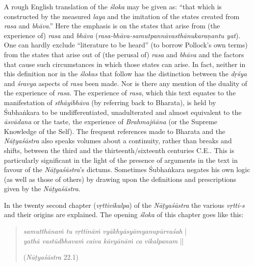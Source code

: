 A rough English translation of the \textsl{śloka} may be given as: “that which is constructed by the measured \textsl{laya} and the imitation of the states created from \textsl{rasa} and \textsl{bhāva}.” Here the emphasis is on the states that arise from (the experience of) \textsl{rasa} and \textsl{bhāva} (\textsl{rasa-bhāva-samutpannāvasthānukaraṇantu yat}). One can hardly exclude “literature to be heard” (to borrow Pollock’s own terms) from the states that arise out of (the perusal of) \textsl{rasa} and \textsl{bhāva} and the factors that cause such circumstances in which those states can arise. In fact, neither in this definition nor in the \textsl{ślokas} that follow has the distinction between the \textsl{dṛśya} and \textsl{śravya} aspects of \textsl{rasa} been made. Nor is there any mention of the duality of the experience of \textsl{rasa}. The experience of \textsl{rasa}, which this text equates to the manifestation of \textsl{sthāyībhāva} (by referring back to Bharata), is held by Śubhaṅkara to be undifferentiated, unadulterated and almost equivalent to the \textsl{āsvādana} or the taste, the experience of \textsl{Brahmajñāna} (or the Supreme Knowledge of the Self). The frequent references made to Bharata and the \textsl{Nāṭyaśāstra} also speaks volumes about a continuity, rather than breaks and shifts, between the third and the thirteenth/sixteenth centuries C.E.. This is particularly significant in the light of the presence of arguments in the text in favour of the \textsl{Nāṭyaśāstra}’s dictums. Sometimes Śubhaṅkara negates his own logic (as well as those of others) by drawing upon the definitions and prescriptions given by the \textsl{Nāṭyaśāstra}.       

In the twenty second chapter (\textsl{vṛttivikalpa}) of the \textsl{Nāṭyaśāstra} the various \textsl{vṛtti-s} and their origins are explained. The opening \textsl{śloka} of this chapter goes like this:
\begin{quote}
\textsl{samutthānaṁ tu vṛttīnāṁ vyākhyāsyāmyanupūrvaśah} |  \\
\textsl{yathā vastūdbhavaṁ caiva kāvyānāṁ ca vikalpanam} ||

\hfill(\textsl{Nāṭyaśāstra} 22.1)
\end{quote}

